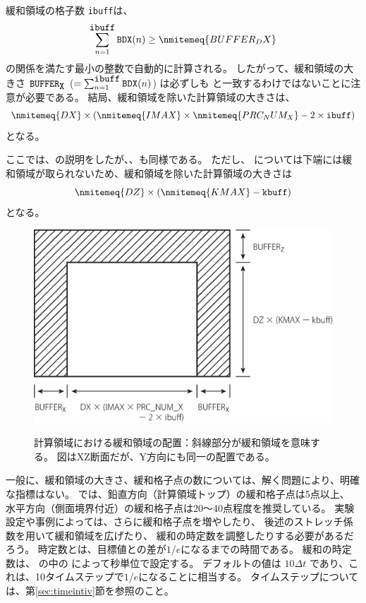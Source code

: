 緩和領域の格子数 \verb|ibuff|は、
\[
\sum_{n=1}^{\verb|ibuff|} \verb|BDX|(n) \ge \nmitemeq{BUFFER_DX} \nonumber
\]
の関係を満たす最小の整数で自動的に計算される。
したがって、緩和領域の大きさ $\verb|BUFFER|_{\verb|X|}$ ($= \sum_{n=1}^{\verb|ibuff|} \verb|BDX|(n)$)
は必ずしも  と一致するわけではないことに注意が必要である。
結局、緩和領域を除いた計算領域の大きさは、
\[
\nmitemeq{DX} \times ( \nmitemeq{IMAX} \times \nmitemeq{PRC_NUM_X} - 2 \times \verb|ibuff| )
\]
となる。

ここでは、{\XDIR}の説明をしたが、{\YDIR}、{\ZDIR}も同様である。
ただし、{\ZDIR} については下端には緩和領域が取られないため、緩和領域を除いた計算領域の大きさは
\[
\nmitemeq{DZ} \times ( \nmitemeq{KMAX} - \verb|kbuff| )
\]
となる。


\begin{figure}[t]
\begin{center}
  \includegraphics[width=0.8\hsize]{./figure/buffer_xz.eps}\\
  \caption{計算領域における緩和領域の配置：斜線部分が緩和領域を意味する。
  図はXZ断面だが、Y方向にも同一の配置である。}
  \label{fig:buff_xz}
\end{center}
\end{figure}


一般に、緩和領域の大きさ、緩和格子点の数については、解く問題により、明確な指標はない。
\scalerm では、鉛直方向（計算領域トップ）の緩和格子点は5点以上、
水平方向（側面境界付近）の緩和格子点は20〜40点程度を推奨している。
実験設定や事例によっては、さらに緩和格子点を増やしたり、
後述のストレッチ係数を用いて緩和領域を広げたり、
緩和の時定数を調整したりする必要があるだろう。
時定数とは、目標値との差が$1/e$になるまでの時間である。
緩和の時定数は、
の中の
によって秒単位で設定する。
デフォルトの値は $10 \Delta t$ であり、これは、10タイムステップで$1/e$になることに相当する。
タイムステップについては、第\ref{sec:timeintiv}節を参照のこと。

